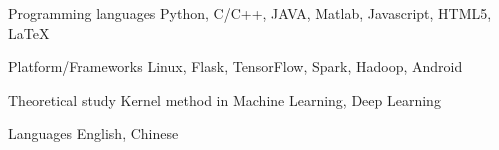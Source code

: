 

\begin{cvskills}

  \cvskill
    {Programming languages} %
    {Python, C/C++, JAVA, Matlab, Javascript, HTML5, LaTeX} %

  \cvskill
    {Platform/Frameworks} %
    {Linux, Flask, TensorFlow, Spark, Hadoop, Android} %

  \cvskill
    {Theoretical study} %
    {Kernel method in Machine Learning, Deep Learning} %

  \cvskill
    {Languages} %
    {English, Chinese} %

\end{cvskills}
